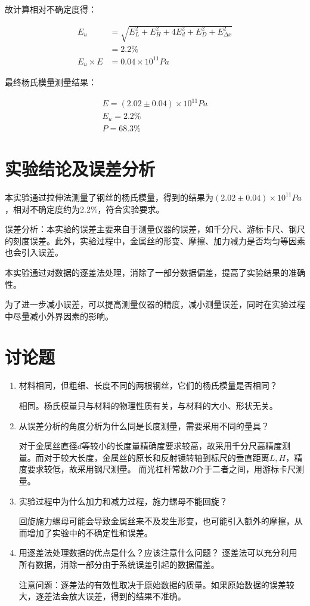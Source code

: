 \documentclass[signature=data]{physicsreport}
\begin{document}
故计算相对不确定度得：

\begin{align*}
         E_u &= \sqrt{ E_L^2 + E_H^2 + 4E_d^2 + E_D^2 + E_{\Delta x}^2 } \\
             &= 2.2\%\\
E_u \times E &= 0.04 \times 10^{11}Pa
\end{align*}

最终杨氏模量测量结果：

\begin{gather*}
E = (2.02 \pm 0.04) \times 10^{11}Pa\\
E_u = 2.2\%\\
P = 68.3\%
\end{gather*}

\section{实验结论及误差分析}
本实验通过拉伸法测量了钢丝的杨氏模量，得到的结果为$(2.02 \pm 0.04) \times 10^{11}Pa$，相对不确定度约为2.2\%，符合实验要求。

误差分析：本实验的误差主要来自于测量仪器的误差，如千分尺、游标卡尺、钢尺的刻度误差。此外，实验过程中，金属丝的形变、摩擦、加力减力是否均匀等因素也会引入误差。

本实验通过对数据的逐差法处理，消除了一部分数据偏差，提高了实验结果的准确性。

为了进一步减小误差，可以提高测量仪器的精度，减小测量误差，同时在实验过程中尽量减小外界因素的影响。

\section{讨论题}
\begin{enumerate}
    \item 材料相同，但粗细、长度不同的两根钢丝，它们的杨氏模量是否相同？
 
    相同。杨氏模量只与材料的物理性质有关，与材料的大小、形状无关。

    \item 从误差分析的角度分析为什么同是长度测量，需要采用不同的量具？
    
    对于金属丝直径$d$等较小的长度量精确度要求较高，故采用千分尺高精度测量。而对于较大长度，金属丝的原长和反射镜转轴到标尺的垂直距离$L,H$，精度要求较低，故采用钢尺测量。
    而光杠杆常数$D$介于二者之间，用游标卡尺测量。

    \item 实验过程中为什么加力和减力过程，施力螺母不能回旋？
    
    回旋施力螺母可能会导致金属丝来不及发生形变，也可能引入额外的摩擦，从而增加了实验中的不确定性和误差。

    \item 用逐差法处理数据的优点是什么？应该注意什么问题？
    逐差法可以充分利用所有数据，消除一部分由于系统误差引起的数据偏差。

    注意问题：逐差法的有效性取决于原始数据的质量。如果原始数据的误差较大，逐差法会放大误差，得到的结果不准确。
\end{enumerate}
\end{document}
